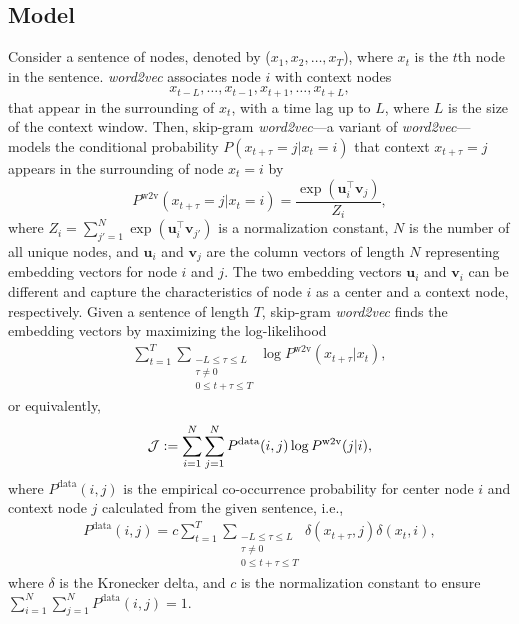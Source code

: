 \documentclass[12pt]{article} %
\def\ie{i.e.,~}
\def\vec#1{{\bm #1}}
\begin{document}
\subsection{Model}

Consider a sentence of nodes, denoted by ($x_{1}, x_{2}, \ldots, x_{T}$), where $x_{t}$ is the $t$th node in the sentence.
\textit{word2vec} associates node $i$ with context nodes
\begin{equation}
    x_{t-L}, \ldots, x_{t-1}, x_{t+1},\ldots, x_{t+L},
\end{equation}
that appear in the surrounding of $x_t$, with a time lag up to $L$, where $L$ is the size of the context window.
Then, skip-gram \textit{word2vec}---a variant of \textit{word2vec}---models the conditional probability $P(x_{t + \tau}=j \vert x_{t} = i)$ that context $x_{t + \tau} = j$ appears in the surrounding of node $x_{t} = i$ by
\begin{equation}
    P^{\text{w2v}}(x_{t + \tau}=j \vert x_{t} = i) = \frac{\exp(\vec{u}_i ^\top \vec{v}_{j})}{Z_i}, \label{eq:cond_prob_w2v}
\end{equation}
where $Z_i=\sum_{j'=1}^N \exp(\vec{u}_{i}^\top \vec{v}_{j'})$ is a normalization constant, $N$ is the number of all unique nodes, and $\vec{u}_i$ and $\vec{v}_j$ are the column vectors of length $N$ representing embedding vectors for node $i$ and $j$.
The two embedding vectors $\vec{u}_i$ and $\vec{v}_i$ can be different and capture the characteristics of node $i$ as a center and a context node, respectively.
Given a sentence of length $T$, skip-gram \textit{word2vec} finds the embedding vectors by maximizing the log-likelihood
\begin{align}
    \sum_{t = 1}^{T} \sum_{\substack{-L \leq \tau \leq L \\ \tau \neq 0 \\ 0\leq t+\tau \leq T }} \log P^{\text{w2v}}(x_{t + \tau} \vert x_{t}), \nonumber
\end{align}
or equivalently,
\begin{align}
       {\cal J} := \sum_{i=1}^N \sum_{j=1}^N P^{\text{data}}(i, j) \log P^{\text{w2v}}(j \vert i), \label{eq:word2vec-obj}
\end{align}
where $P^{\text{data}}(i,j)$ is the empirical co-occurrence probability for center node $i$ and context node $j$ calculated from the given sentence, \ie
\begin{align}
    P^{\text{data}}(i,j) = c \sum_{t = 1}^{T} \sum_{\substack{-L \leq \tau \leq L \\ \tau \neq 0 \\ 0\leq t+\tau \leq T }} \delta(x_{t + \tau},j)\delta(x_{t}, i),
\end{align}
where $\delta$ is the Kronecker delta, and $c$ is the normalization constant to ensure $\sum_{i=1}^N \sum_{j=1}^N P^{\text{data}}(i,j)=1$.
\end{document}
